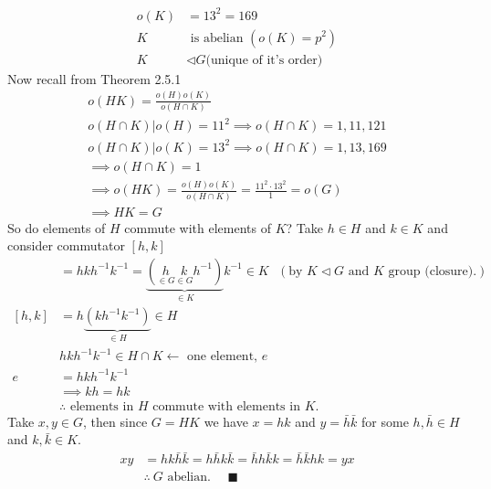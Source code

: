 \begin{enumerate}
\begin{align}
        o(K)&=13^2=169\nonumber \\
        K &\text{ is abelian }(o(K)=p^2) \nonumber \\
        K&\triangleleft G  \text{(unique of it's order)} \nonumber
    \end{align}
    Now recall from Theorem 2.5.1
    \begin{align}
        o(HK)= \frac{o(H)o(K)}{o(H\cap K)} \nonumber \\
        o(H\cap K) | o(H)=11^2 \implies o(H\cap K) = 1, 11, 121 \nonumber \\
        o(H\cap K) | o(K)=13^2 \implies o(H\cap K) = 1, 13, 169 \nonumber \\
        \implies  o(H\cap K) = 1 \nonumber \\
        \implies o(HK) = \frac{o(H)o(K)}{o(H\cap K)}= \frac{11^2\cdot 13^2}{1} = o(G) \nonumber \\
        \implies HK = G \nonumber
    \end{align}
    So do elements of $H$ commute with elements of $K$? Take $h\in H$ and $k\in K$ and consider commutator $[h,k]$
    \begin{align}
        [h,k] &= hkh^{-1}k^{-1} = \underbrace{(\underset{\in G}{h}\underset{\in G}{k}h^{-1})}_{\in K}k^{-1} \in K  \ \ \  (\text{by } K\triangleleft G \text{ and } K \text{ group (closure)}.) \nonumber \\
        [h,k] &= h\underbrace{(kh^{-1}k^{-1})}_{\in H} \in H \nonumber \\
        &hkh^{-1}k^{-1} \in H\cap K \leftarrow \text{ one element, }e \nonumber \\
        e&= hkh^{-1}k^{-1} \nonumber \\
        &\implies kh=hk \nonumber \\
        &\therefore \text{ elements in }H \text{ commute with elements in }K. \nonumber
    \end{align}
    Take $x,y \in G$, then since $G=HK$ we have $x=hk$ and $y=\bar{h}\bar{k}$ for some $h,\bar{h}\in H$ and $k,\bar{k}\in K$.
    \begin{align}
        xy&=hk\bar{h}\bar{k}=h\bar{h}k\bar{k}=\bar{h}h\bar{k}k=\bar{h}\bar{k}hk=yx \nonumber \\
        &\therefore \ G \text{ abelian}. \ \ \ \ \ \ \blacksquare \nonumber
    \end{align}
\end{enumerate}
